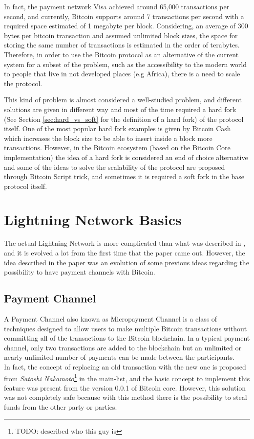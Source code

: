 In fact, the payment network Visa achieved around 65,000\cite{visa-sheet} transactions per second, and currently,
Bitcoin supports around 7 transactions per second with a required space estimated of 1 megabyte per block. Considering,
an average of 300 bytes per bitcoin transaction and assumed unlimited block sizes, the space for storing the same number
of transactions is estimated in the order of terabytes\cite{lightning-network-paper}. Therefore, in order to use the Bitcoin
protocol as an alternative of the current system for a subset of the problem, such as the accessibility to the modern world
to people that live in not developed places (e.g Africa), there is a need to scale the protocol.

This kind of problem is almost considered a well-studied problem, and different solutions are given in different
way and most of the time required a hard fork (See Section \ref{sec:hard_vs_soft} for the definition of a hard fork) of the protocol itself.
One of the most popular hard fork examples is given by Bitcoin Cash which increases the block size to be able to insert
inside a block more transactions.
However, in the Bitcoin ecosystem (based on the Bitcoin Core implementation) the idea of a hard fork is considered an
end of choice alternative and some of the ideas to solve the scalability of the protocol are proposed through Bitcoin Script trick,
and sometimes it is required a soft fork in the base protocol itself.

\section{Lightning Network Basics}

The actual Lightning Network is more complicated than what was described in \cite{lightning-network-paper}, and it is
evolved a lot from the first time that the paper came out. However, the idea described in the paper was an evolution
of some previous ideas regarding the possibility to have payment channels with Bitcoin.

\subsection{Payment Channel}

A Payment Channel also known as Micropayment Channel is a class of techniques designed to allow users to make multiple
Bitcoin transactions without committing all of the transactions to the Bitcoin blockchain. In a typical payment channel,
only two transactions are added to the blockchain but an unlimited or nearly unlimited number of payments
can be made between the participants.\\
In fact, the concept of replacing an old transaction with the new one is proposed from \emph{Satoshi Nakamoto}\footnote{TODO: described who this guy is} in the main-list\cite{payment-channels-satoshi}, and
the basic concept to implement this feature was present from the version 0.0.1 of Bitcoin core. However, this solution
was not completely safe because with this method there is the possibility to steal funds from the other party or parties.\\

